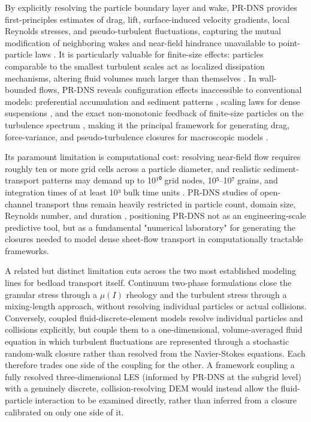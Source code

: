 By explicitly resolving the particle boundary layer and wake, PR-DNS provides first-principles estimates of drag, lift, surface-induced velocity gradients, local Reynolds stresses, and pseudo-turbulent fluctuations, capturing the mutual modification of neighboring wakes and near-field hindrance unavailable to point-particle laws \cite{chouippe__2023,PEND_Crowe2012,moore__2019}. It is particularly valuable for finite-size effects: particles comparable to the smallest turbulent scales act as localized dissipation mechanisms, altering fluid volumes much larger than themselves \cite{chouippe__2023,PEND_Finn2016,vreman__2015}. In wall-bounded flows, PR-DNS reveals configuration effects inaccessible to conventional models: preferential accumulation and sediment patterns \cite{PEND_Kidanemariam2014}, scaling laws for dense suspensions \cite{PEND_Costa2015}, and the exact non-monotonic feedback of finite-size particles on the turbulence spectrum \cite{chouippe__2023,PEND_Picano2015}, making it the principal framework for generating drag, force-variance, and pseudo-turbulence closures for macroscopic models \cite{kuerten__2016,moore__2019,tavanashad__2021}.

Its paramount limitation is computational cost: resolving near-field flow requires roughly ten or more grid cells across a particle diameter, and realistic sediment-transport patterns may demand up to 10¹⁰ grid nodes, 10⁵--10⁷ grains, and integration times of at least 10³ bulk time units \cite{elghannay__2018,rupp__2021}. PR-DNS studies of open-channel transport thus remain heavily restricted in particle count, domain size, Reynolds number, and duration \cite{elghannay__2018,PEND_Jaiswal2022,vreman__2015}, positioning PR-DNS not as an engineering-scale predictive tool, but as a fundamental "numerical laboratory" for generating the closures needed to model dense sheet-flow transport in computationally tractable frameworks.

A related but distinct limitation cuts across the two most established modeling lines for bedload transport itself. Continuum two-phase formulations \cite{chauchat__2013} close the granular stress through a $\mu(I)$ rheology and the turbulent stress through a mixing-length approach, without resolving individual particles or actual collisions. Conversely, coupled fluid-discrete-element models \cite{maurin__2015,maurin__2016} resolve individual particles and collisions explicitly, but couple them to a one-dimensional, volume-averaged fluid equation in which turbulent fluctuations are represented through a stochastic random-walk closure rather than resolved from the Navier-Stokes equations. Each therefore trades one side of the coupling for the other. A framework coupling a fully resolved three-dimensional LES (informed by PR-DNS at the subgrid level) with a genuinely discrete, collision-resolving DEM would instead allow the fluid-particle interaction to be examined directly, rather than inferred from a closure calibrated on only one side of it.

